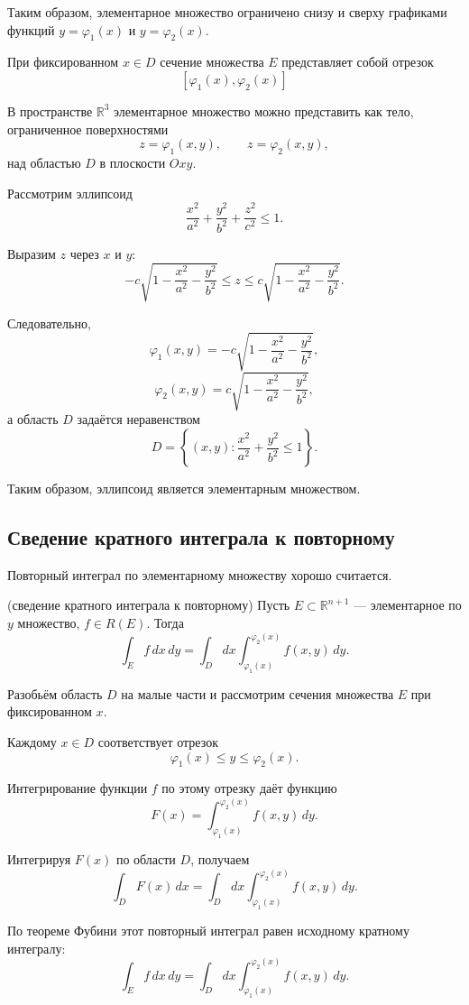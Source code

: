 \documentclass[12pt,a4paper]{article}
\begin{document}
Таким образом, элементарное множество ограничено снизу и сверху графиками функций
$y=\varphi_1(x)$ и $y=\varphi_2(x)$.

При фиксированном $x\in D$ сечение множества $E$ представляет собой отрезок
\[
[\varphi_1(x),\varphi_2(x)]
\]

В пространстве $\mathbb{R}^3$ элементарное множество можно представить как тело, ограниченное поверхностями
\[
z=\varphi_1(x,y),\qquad z=\varphi_2(x,y),
\]
над областью $D$ в плоскости $Oxy$.

\begin{example}
Рассмотрим эллипсоид
\[
\frac{x^2}{a^2}+\frac{y^2}{b^2}+\frac{z^2}{c^2}\leq 1.
\]

Выразим $z$ через $x$ и $y$:
\[
-c\sqrt{1-\frac{x^2}{a^2}-\frac{y^2}{b^2}}
\leq z\leq
c\sqrt{1-\frac{x^2}{a^2}-\frac{y^2}{b^2}}.
\]

Следовательно,
\[
\varphi_1(x,y)=
-c\sqrt{1-\frac{x^2}{a^2}-\frac{y^2}{b^2}},
\]
\[
\varphi_2(x,y)=
c\sqrt{1-\frac{x^2}{a^2}-\frac{y^2}{b^2}},
\]
а область $D$ задаётся неравенством
\[
D=\left\{(x,y):
\frac{x^2}{a^2}+\frac{y^2}{b^2}\leq 1\right\}.
\]

Таким образом, эллипсоид является элементарным множеством.
\end{example}

\subsection{Сведение кратного интеграла к повторному}

Повторный интеграл по элементарному множеству хорошо считается.

\begin{theorem}{(сведение кратного интеграла к повторному)}
Пусть $E\subset\mathbb{R}^{n+1}$ — элементарное по $y$ множество,
$f\in R(E)$. Тогда
\[
\int_E f\,dx\,dy
=
\int_D dx
\int_{\varphi_1(x)}^{\varphi_2(x)}
f(x,y)\,dy.
\]
\end{theorem}

\begin{proofbox}{}
Разобьём область $D$ на малые части и рассмотрим сечения множества $E$ при фиксированном $x$.

Каждому $x\in D$ соответствует отрезок
\[
\varphi_1(x)\leq y\leq\varphi_2(x).
\]

Интегрирование функции $f$ по этому отрезку даёт функцию
\[
F(x)=\int_{\varphi_1(x)}^{\varphi_2(x)}f(x,y)\,dy.
\]

Интегрируя $F(x)$ по области $D$, получаем
\[
\int_D F(x)\,dx
=
\int_D dx
\int_{\varphi_1(x)}^{\varphi_2(x)}
f(x,y)\,dy.
\]

По теореме Фубини этот повторный интеграл равен исходному кратному интегралу:
\[
\int_E f\,dx\,dy
=
\int_D dx
\int_{\varphi_1(x)}^{\varphi_2(x)}
f(x,y)\,dy.
\]
\end{proofbox}
\end{document}
